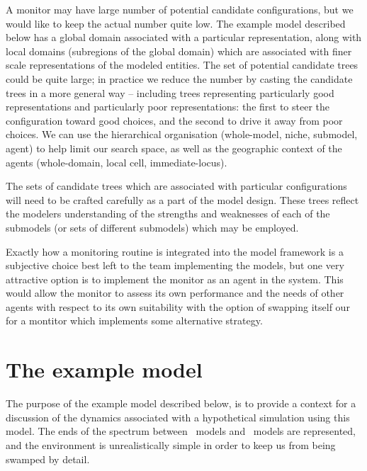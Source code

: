 A monitor may have large number of potential candidate con\-fig\-ur\-a\-tions,
but we would like to keep the actual number quite low. The example
model described below has a global domain associated with a particular
rep\-re\-sen\-ta\-tion, along with local domains (subregions of the global
domain) which are associated with finer scale rep\-re\-sen\-ta\-tions of the
modeled entities. The set of potential candidate trees could be quite
large; in practice we reduce the number by casting the candidate trees
in a more general way -- including trees representing particularly
good rep\-re\-sen\-ta\-tions and particularly poor rep\-re\-sen\-ta\-tions: the first
to steer the con\-fig\-ur\-a\-tion toward good choices, and the second to
drive it away from poor choices. We can use the hierarchical
organisation (whole-model, niche, sub\-model, agent) to help limit our
search space, as well as the geographic context of the agents (whole-domain, local
cell, immediate-locus).

The sets of candidate trees which are associated with particular
con\-fig\-ur\-a\-tions will need to be crafted carefully as a part of the
model design. These trees reflect the modelers understanding of the
strengths and weaknesses of each of the sub\-models (or sets of
different sub\-models) which may be employed.

Exactly how a monitoring routine is integrated into the model
framework is a subjective choice best left to the team implementing
the models, but one very attractive option is to implement the monitor
as an agent in the system. This would allow the monitor to assess its
own performance and the needs of other agents with respect to its own
suitability with the option of swapping itself our for a montitor
which implements some alternative strategy. 


\section{The example model}

The purpose of the example model described below, is to provide a
context for a discussion of the dynamics associated with a
hypothetical simulation using this model.  The ends of the
spectrum between \SD\ models and \IB\ models are represented, and the
environment is unrealistically simple in order to keep us from being
swamped by detail. 


